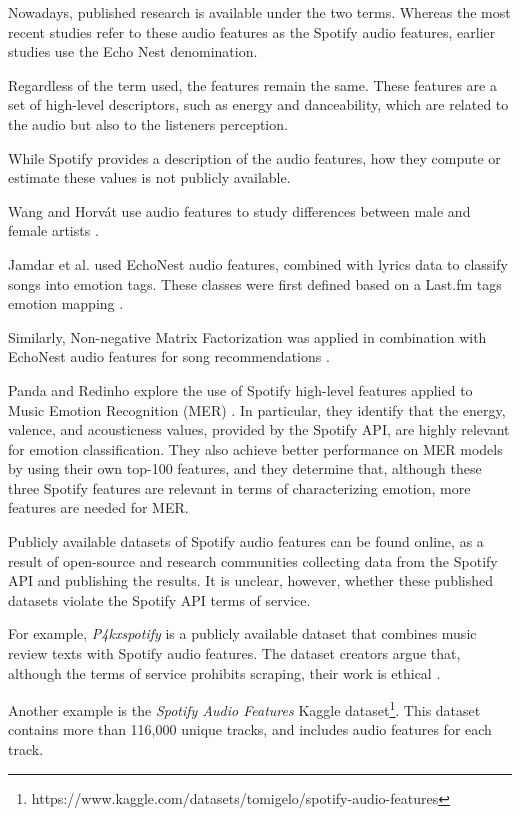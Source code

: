 \documentclass[sn-mathphys]{sn-jnl}%
\theoremstyle{thmstyleone}%
\theoremstyle{thmstyletwo}%
\theoremstyle{thmstylethree}%
\begin{document}
Nowadays, published research is available under the two terms.
Whereas the most recent studies refer to these audio features as the Spotify audio features,
earlier studies use the Echo Nest denomination.

Regardless of the term used, the features remain the same.
These features are a set of high-level descriptors, such as energy and danceability,
which are related to the audio but also to the listeners perception.

While Spotify provides a description of the audio features, how they compute or estimate these values is not publicly available.

Wang and Horv{\'a}t use audio features to study differences between male and female artists \cite{wang2019gender}.

Jamdar et al. used EchoNest audio features, combined with lyrics data to classify songs into emotion tags.
These classes were first defined based on a Last.fm tags emotion mapping \cite{jamdar2015emotion}.

Similarly, Non-negative Matrix Factorization was applied in combination with EchoNest audio features
for song recommendations \cite{benzi2016song}.

Panda and Redinho explore the use of Spotify high-level features applied to Music Emotion Recognition (MER) \cite{panda2021does}.
In particular, they identify that the energy, valence, and acousticness values, provided by the Spotify API,
are highly relevant for emotion classification.
They also achieve better performance on MER models by using their own top-100 features, and they determine that,
although these three Spotify features are relevant in terms of characterizing emotion, more features are needed for MER.

Publicly available datasets of Spotify audio features can be found online,
as a result of open-source and research communities collecting data from the Spotify API and publishing the results.
It is unclear, however, whether these published datasets violate the Spotify API terms of service.

For example, \emph{P4kxspotify} is a publicly available dataset that combines music review texts with Spotify audio features.
The dataset creators argue that, although the terms of service prohibits scraping, their work is ethical \cite{pinter2020p4kxspotify}.

Another example is the \emph{Spotify Audio Features} Kaggle dataset\footnote[4]{https://www.kaggle.com/datasets/tomigelo/spotify-audio-features}.
This dataset contains more than 116,000 unique tracks, and includes audio features for each track.
\end{document}
